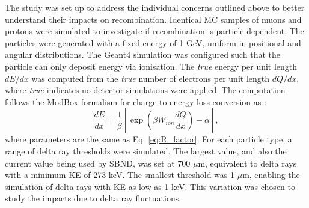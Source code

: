 The study was set up to address the individual concerns outlined above to better understand their impacts on recombination.
Identical MC samples of muons and protons were simulated to investigate if recombination is particle-dependent.
The particles were generated with a fixed energy of 1 GeV, uniform in positional and angular distributions.
The Geant4 simulation was configured such that the particle can only deposit energy via ionisation.
The \textit{true} energy per unit length $dE/dx$ was computed from the \textit{true} number of electrons per unit length $dQ/dx$, where \textit{true} indicates no detector simulations were applied. 
The computation follows the ModBox formalism for charge to energy loss conversion as \cite{argoneut_recomb}:
\begin{equation}
        \label{eq:recomb_modbox}
        \frac{dE}{dx} = \frac{1}{\beta}\left[ \exp{\left( \beta W_{ion}  \frac{dQ}{dx}\right)} -\alpha \right],
\end{equation}
where parameters are the same as Eq. \ref{eq:R_factor}.
For each particle type, a range of delta ray thresholds were simulated.
The largest value, and also the current value being used by SBND, was set at 700 $\mu$m, equivalent to delta rays with a minimum KE of 273 keV.
The smallest threshold was 1 $\mu$m, enabling the simulation of delta rays with KE as low as 1 keV.
This variation was chosen to study the impacts due to delta ray fluctuations.


%

